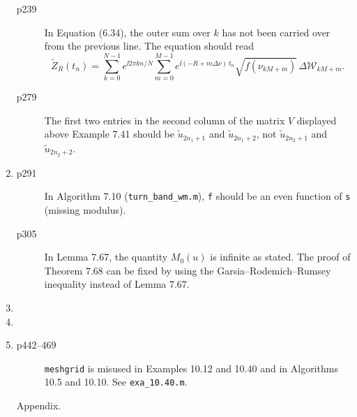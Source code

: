 \documentclass[final]{article}
\theoremstyle{definition}
\begin{document}
\begin{enumerate}
\begin{description}
\item[p239]  In Equation (6.34), the outer sum over $k$ has not been carried over from the previous line. The equation should read 
$$
\tilde{Z}_R(t_n)=
\sum_{k=0}^{N-1}e^{\ii 2 \pi k n/N}\sum_{m=0}^{M-1} e^{\ii(-R+m \Delta \nu)\,t_n}\sqrt{f(\nu_{kM+m})}\,\Delta \mathcal W_{kM+m}.
$$



   \item[p279] The first two entries in the second column of the matrix $V$ displayed above Example 7.41 should be $\tilde{u}_{2n_{1}+1}$ and $\tilde{u}_{2n_{1}+2}$, not $\tilde{u}_{2n_{2}+1}$ and $\tilde{u}_{2n_{2}+2}$.
   \end{description}
 \item%
 \begin{description}
     
   \item[p291] In Algorithm 7.10 (\texttt{turn\_band\_wm.m}), \texttt{f} should be an even function of \texttt{s} (missing modulus).
\item[p305]
In  Lemma 7.67, the quantity $M_0(u)$ is infinite as stated. 
 The proof of Theorem
7.68 can be fixed by using the Garsia--Rodemich--Rumsey inequality instead
of Lemma 7.67. 

   \end{description}
 \item%
   \begin{description}
   \item
   \end{description}
 \item %
   \begin{description}
   \item
   \end{description}
 \item %
   \begin{description}
   \item[p442–469] \texttt{meshgrid} is misused in Examples 10.12 and 10.40 and in Algorithms 10.5 and 10.10. See \texttt{exa\_10.40.m}.
   \end{description}
 \item[Appendix.]\hphantom{\,}
 \end{enumerate}
\end{document}
